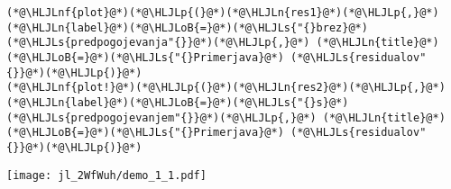 \documentclass[12pt,a4paper]{article}
\newcommand{\HLJLn}[1]{#1}
\newcommand{\HLJLnf}[1]{\textcolor[RGB]{66,102,213}{#1}}
\newcommand{\HLJLs}[1]{\textcolor[RGB]{201,61,57}{#1}}
\newcommand{\HLJLoB}[1]{\textcolor[RGB]{102,102,102}{\textbf{#1}}}
\newcommand{\HLJLp}[1]{#1}
\begin{document}
\begin{lstlisting}
(*@\HLJLnf{plot}@*)(*@\HLJLp{(}@*)(*@\HLJLn{res1}@*)(*@\HLJLp{,}@*) (*@\HLJLn{label}@*)(*@\HLJLoB{=}@*)(*@\HLJLs{"{}brez}@*) (*@\HLJLs{predpogojevanja"{}}@*)(*@\HLJLp{,}@*) (*@\HLJLn{title}@*)(*@\HLJLoB{=}@*)(*@\HLJLs{"{}Primerjava}@*) (*@\HLJLs{residualov"{}}@*)(*@\HLJLp{)}@*)
(*@\HLJLnf{plot!}@*)(*@\HLJLp{(}@*)(*@\HLJLn{res2}@*)(*@\HLJLp{,}@*) (*@\HLJLn{label}@*)(*@\HLJLoB{=}@*)(*@\HLJLs{"{}s}@*) (*@\HLJLs{predpogojevanjem"{}}@*)(*@\HLJLp{,}@*) (*@\HLJLn{title}@*)(*@\HLJLoB{=}@*)(*@\HLJLs{"{}Primerjava}@*) (*@\HLJLs{residualov"{}}@*)(*@\HLJLp{)}@*)
\end{lstlisting}

\texttt{[image: jl\_2WfWuh/demo\_1\_1.pdf]}
\end{document}
